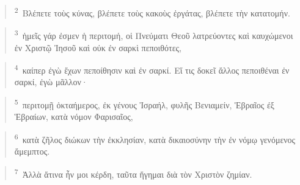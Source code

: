 \documentclass{article}
\newcommand{\currentverse}{1} %
\newcommand{\setcurrentverse}[1]{\renewcommand{\currentverse}{#1}}
\begin{document}
\begin{verse}

\setcurrentverse{2}

\setcounter{footnote}{0}

\textsuperscript{2}~Βλέπετε τοὺς κύνας, βλέπετε τοὺς κακοὺς ἐργάτας, βλέπετε τὴν κατατομήν.

\end{verse}

\begin{verse}

\setcurrentverse{3}

\setcounter{footnote}{0}

\textsuperscript{3}~ἡμεῖς γάρ ἐσμεν ἡ περιτομή, οἱ Πνεύματι Θεοῦ λατρεύοντες καὶ καυχώμενοι ἐν Χριστῷ Ἰησοῦ καὶ οὐκ ἐν σαρκὶ πεποιθότες,

\end{verse}

\begin{verse}

\setcurrentverse{4}

\setcounter{footnote}{0}

\textsuperscript{4}~καίπερ ἐγὼ ἔχων πεποίθησιν καὶ ἐν σαρκί. Εἴ τις δοκεῖ ἄλλος πεποιθέναι ἐν σαρκί, ἐγὼ μᾶλλον·

\end{verse}

\begin{verse}

\setcurrentverse{5}

\setcounter{footnote}{0}

\textsuperscript{5}~περιτομῇ ὀκταήμερος, ἐκ γένους Ἰσραήλ, φυλῆς Βενιαμείν, Ἑβραῖος ἐξ Ἑβραίων, κατὰ νόμον Φαρισαῖος,

\end{verse}

\begin{verse}

\setcurrentverse{6}

\setcounter{footnote}{0}

\textsuperscript{6}~κατὰ ζῆλος διώκων τὴν ἐκκλησίαν, κατὰ δικαιοσύνην τὴν ἐν νόμῳ γενόμενος ἄμεμπτος.

\end{verse}

\begin{verse}

\setcurrentverse{7}

\setcounter{footnote}{0}

\textsuperscript{7}~Ἀλλὰ ἅτινα ἦν μοι κέρδη, ταῦτα ἥγημαι διὰ τὸν Χριστὸν ζημίαν.

\end{verse}
\end{document}
